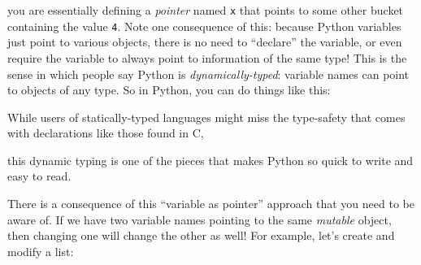 \begin{Shaded}
\begin{Highlighting}[]
\OperatorTok{=} 
\end{Highlighting}
\end{Shaded}

you are essentially defining a \emph{pointer} named \texttt{x} that
points to some other bucket containing the value \texttt{4}. Note one
consequence of this: because Python variables just point to various
objects, there is no need to ``declare'' the variable, or even require
the variable to always point to information of the same type! This is
the sense in which people say Python is \emph{dynamically-typed}:
variable names can point to objects of any type. So in Python, you can
do things like this:

\begin{Shaded}
\begin{Highlighting}[]
\OperatorTok{=}          
\OperatorTok{=}    
\OperatorTok{=} \NormalTok{[}\NormalTok{, }\NormalTok{, }\NormalTok{] }
\end{Highlighting}
\end{Shaded}

While users of statically-typed languages might miss the type-safety
that comes with declarations like those found in C,

\begin{Shaded}
\begin{Highlighting}[]
 \NormalTok{;}
\end{Highlighting}
\end{Shaded}

this dynamic typing is one of the pieces that makes Python so quick to
write and easy to read.

There is a consequence of this ``variable as pointer'' approach that you
need to be aware of. If we have two variable names pointing to the same
\emph{mutable} object, then changing one will change the other as well!
For example, let's create and modify a list:

\begin{Shaded}
\begin{Highlighting}[]
\OperatorTok{=} \NormalTok{[}\NormalTok{, }\NormalTok{, }\NormalTok{]}
\OperatorTok{=} 
\end{Highlighting}
\end{Shaded}

